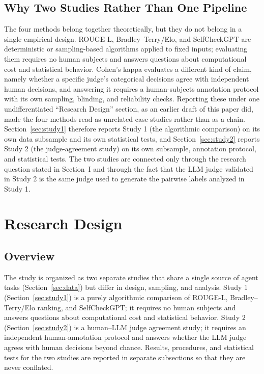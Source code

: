\documentclass[conference]{IEEEtran}
\begin{document}
\subsection{Why Two Studies Rather Than One Pipeline}
The four methods belong together theoretically, but they do not belong in a single empirical design. ROUGE-L, Bradley--Terry/Elo, and SelfCheckGPT are deterministic or sampling-based algorithms applied to fixed inputs; evaluating them requires no human subjects and answers questions about computational cost and statistical behavior. Cohen's kappa evaluates a different kind of claim, namely whether a specific judge's categorical decisions agree with independent human decisions, and answering it requires a human-subjects annotation protocol with its own sampling, blinding, and reliability checks. Reporting these under one undifferentiated ``Research Design'' section, as an earlier draft of this paper did, made the four methods read as unrelated case studies rather than as a chain. Section~\ref{sec:study1} therefore reports Study 1 (the algorithmic comparison) on its own data subsample and its own statistical tests, and Section~\ref{sec:study2} reports Study 2 (the judge-agreement study) on its own subsample, annotation protocol, and statistical tests. The two studies are connected only through the research question stated in Section~I and through the fact that the LLM judge validated in Study 2 is the same judge used to generate the pairwise labels analyzed in Study 1.

\section{Research Design}
\subsection{Overview}
The study is organized as two separate studies that share a single source of agent tasks (Section~\ref{sec:data}) but differ in design, sampling, and analysis. Study 1 (Section~\ref{sec:study1}) is a purely algorithmic comparison of ROUGE-L, Bradley--Terry/Elo ranking, and SelfCheckGPT; it requires no human subjects and answers questions about computational cost and statistical behavior. Study 2 (Section~\ref{sec:study2}) is a human--LLM judge agreement study; it requires an independent human-annotation protocol and answers whether the LLM judge agrees with human decisions beyond chance. Results, procedures, and statistical tests for the two studies are reported in separate subsections so that they are never conflated.
\end{document}
